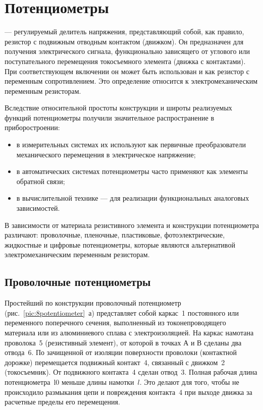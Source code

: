 \chapter{Потенциометры}

 --- регулируемый делитель напряжения, представляющий собой, как правило, резистор с подвижным отводным контактом (движком). Он предназначен для получения электрического сигнала, функционально зависящего от углового или поступательного перемещения токосъемного элемента (движка с контактами). При соответствующем включении он может быть использован и как резистор с переменным сопротивлением. Это определение относится к электромеханическим переменным резисторам.

Вследствие относительной простоты конструкции и широты реализуемых функций потенциометры получили значительное распространение в приборостроении: 
\begin{itemize}
	\item в измерительных системах их используют как первичные преобразователи механического перемещения в электрическое напряжение;
	\item в автоматических системах потенциометры часто применяют как элементы обратной связи;
	\item в вычислительной технике --- для реализации функциональных аналоговых зависимостей.
\end{itemize}

В зависимости от материала резистивного элемента и конструкции потенциометра различают: проволочные, пленочные, пластиковые, фотоэлектрические, жидкостные и цифровые потенциометры, которые являются альтернативой электромеханическим переменным резисторам.

\section{Проволочные потенциометры}

Простейший по конструкции проволочный потенциометр (рис.~\ref{pic:8potentiometer}~а) представляет собой каркас~1 постоянного или переменного поперечного сечения, выполненный из токонепроводящего материала или из алюминиевого сплава с электроизоляцией. На каркас намотана проволока~5 (резистивный элемент), от которой в точках А и В сделаны два отвода~6. По зачищенной от изоляции поверхности проволоки (контактной дорожке) перемещается подвижный контакт~4, связанный с движком~2 (токосъемник). От подвижного контакта~4 сделан отвод~3. Полная рабочая длина потенциометра~l0 меньше длины намотки~$ l $. Это делают для того, чтобы не происходило размыкания цепи и повреждения контакта~4 при выходе движка за расчетные пределы его перемещения.

